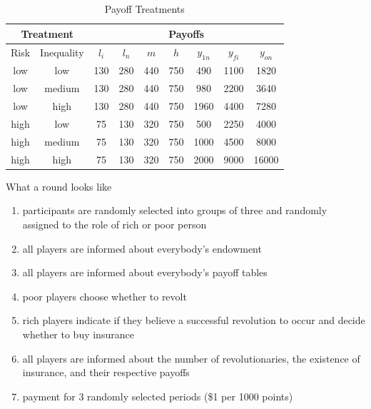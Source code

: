 \documentclass[mathserif]{beamer}
\begin{document}
	\begin{frame}
		\begin{table}[!htbp]
			\caption{Payoff Treatments}
			\label{allpayoffs}
			\centering
			\begin{tabular}{|c|c||c|c|c|c||c|c|c|}
				\multicolumn{2}{c}{Treatment} &\multicolumn{7}{c}{Payoffs}\\
				\hline
				Risk & Inequality & $l_i$ & $l_n$ & $m$ & $h$ & $y_{1n}$ & $y_{fi}$ 
				& $y_{on}$\\
				\hline
				low & low & 130 & 280 & 440 & 750 & 490 & 1100 & 1820\\
				low & medium & 130 & 280 & 440 & 750 & 980 & 2200 & 3640\\
				low & high & 130 & 280 & 440 & 750 & 1960 & 4400 & 7280\\
				high & low & 75 & 130 & 320 & 750 & 500 & 2250 & 4000\\
				high & medium & 75 & 130 & 320 & 750 & 1000 & 4500 & 8000\\
				high & high & 75 & 130 & 320 & 750 & 2000 & 9000 & 16000\\			
				\hline
			\end{tabular}
		\end{table}
	\end{frame}
	
	\begin{frame}{What a round looks like}
		\begin{enumerate}[<+->]
			\item participants are randomly selected into groups of three and randomly assigned to the role of rich or poor person
			\item all players are informed about everybody's endowment
			\item all players are informed about everybody's payoff tables
			\item poor players choose whether to revolt
			\item rich players indicate if they believe a successful revolution to occur and decide whether to buy insurance
			\item all players are informed about the number of revolutionaries, the existence of insurance, and their respective payoffs
			\item payment for 3 randomly selected periods (\$1 per 1000 points)
		\end{enumerate}
	\end{frame}
	
\end{document}
